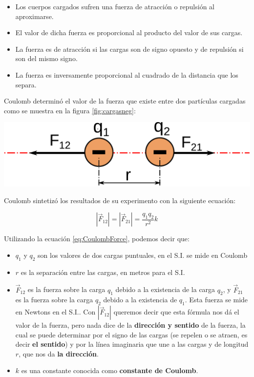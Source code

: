 \documentclass{article}
\begin{document}
\begin{itemize}
\item Los cuerpos cargados sufren una fuerza de atracción o repulsión al aproximarse.
\item El valor de dicha fuerza es proporcional al producto del valor de sus cargas.
\item La fuerza es de atracción si las cargas son de signo opuesto y de repulsión si son del mismo signo.
\item La fuerza es inversamente proporcional al cuadrado de la distancia que los separa.
\end{itemize}

Coulomb determinó el valor de la fuerza que existe entre dos partículas cargadas como se muestra en la figura \ref{fig:cargasneg}:

\begin{center}
	\includegraphics[scale=0.25]{figuras/cargasneg.pdf}
\label{fig:cargasneg}
\end{center}

Coulomb sintetizó los resultados de su experimento con la siguiente ecuación:

\begin{equation}
|\vec{F}_{12}| = |\vec{F}_{21}| = \frac{q_1q_2}{r^2}k
\label{eq:CoulombForce}
\end{equation}

Utilizando la ecuación \ref{eq:CoulombForce}, podemos decir que: 

\begin{itemize}
\item $q_1$ y $q_2$ son los valores de dos cargas puntuales, en el S.I. se mide en Coulomb
\item $r$ es la separación entre las cargas, en metros para el S.I.
\item $\vec{F}_{12}$ es la fuerza sobre la carga $q_1$ debido a la existencia de la carga $q_2$, y $\vec{F}_{21}$ es la fuerza sobre la carga $q_2$ debido a la existencia de $q_1$. Esta fuerza se mide en Newtons en el S.I.. Con $|\vec{F}_{12}|$ queremos decir que esta fórmula nos dá el valor de la fuerza, pero nada dice de la \textbf{dirección y sentido} de la fuerza, la cual se puede determinar por el signo de las cargas (se repelen o se atraen, es decir \textbf{el sentido}) y por la línea imaginaria que une a las cargas y de longitud $r$, que nos da \textbf{la dirección}.
\item $k$ es una constante conocida como \textbf{constante de Coulomb}. 
\end{itemize}
\end{document}
